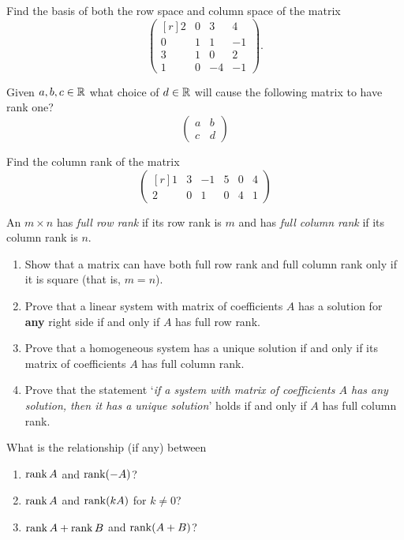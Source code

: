 \begin{exercise}{}{}
 Find the basis of both the row space and column space of the matrix
 \[
  \begin{pmatrix*}[r]
   2 & 0 & 3 & 4\\
   0 & 1 & 1 & -1\\
   3 & 1 & 0 & 2\\
   1 & 0 & -4 & -1
  \end{pmatrix*}.
 \]
\end{exercise}
\begin{exercise}{}{}
 Given $a,b,c \in \mathbb{R}$ what choice of $d \in \mathbb{R}$ will cause the following matrix
 to have rank one?
 \[
  \begin{pmatrix}
   a & b\\
   c & d
  \end{pmatrix}
 \]
\end{exercise}
\begin{exercise}{}{}
 Find the column rank of the matrix
 \[
  \begin{pmatrix*}[r]
   1 & 3 & -1 & 5 & 0 & 4\\
   2 & 0 & 1 & 0 & 4 & 1
  \end{pmatrix*}
 \]
\end{exercise}

\begin{exercise}{}{}
 An $m \times n$ has \emph{full row rank} if its row rank is $m$ and has
 \emph{full column rank} if its column rank is $n$.
 \begin{enumerate}[label=(\alph*)]
  \item Show that a matrix can have both full row rank and full column rank only
   if it is square (that is, $m = n$).
  \item Prove that a linear system with matrix of coefficients $A$ has a
   solution for \textbf{any} right side if and only if $A$ has full row rank.
  \item Prove that a homogeneous system has a unique solution if and only if its
   matrix of coefficients $A$ has full column rank.
  \item Prove that the statement `\emph{if a system with matrix of coefficients
   $A$ has any solution, then it has a unique solution}' holds if and only if
   $A$ has full column rank.
 \end{enumerate}
\end{exercise}

\begin{exercise}{}{}
 What is the relationship (if any) between
 \begin{enumerate}[label=(\alph*)]
  \item $\operatorname{rank} A$ and $\operatorname{rank}(-A)$?
  \item $\operatorname{rank} A$ and $\operatorname{rank}(kA)$ for $k \neq 0$?
  \item $\operatorname{rank} A + \operatorname{rank} B$ and $\operatorname{rank}(A + B)$?
 \end{enumerate}
\end{exercise}
